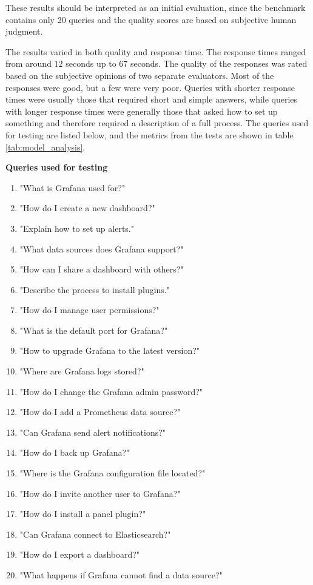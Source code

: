 \documentclass[fleqn,moreauthors,10pt]{ds_report}
\begin{document}
These results should be interpreted as an initial evaluation, since the benchmark contains only 20 queries and the quality scores are based on subjective human judgment.

The results varied in both quality and response time. The response times ranged from around $12$ seconds up to $67$ seconds. The quality of the responses was rated based on the subjective opinions of two separate evaluators. Most of the responses were good, but a few were very poor. Queries with shorter response times were usually those that required short and simple answers, while queries with longer response times were generally those that asked how to set up something and therefore required a description of a full process. The queries used for testing are listed below, and the metrics from the tests are shown in table \ref{tab:model_analysis}.

\textbf{Queries used for testing}
\begin{enumerate}
    \item "What is Grafana used for?"
    \item "How do I create a new dashboard?"
    \item "Explain how to set up alerts."
    \item "What data sources does Grafana support?"
    \item "How can I share a dashboard with others?"
    \item "Describe the process to install plugins."
    \item "How do I manage user permissions?"
    \item "What is the default port for Grafana?"
    \item "How to upgrade Grafana to the latest version?"
    \item "Where are Grafana logs stored?"
    \item "How do I change the Grafana admin password?"
    \item "How do I add a Prometheus data source?"
    \item "Can Grafana send alert notifications?"
    \item "How do I back up Grafana?"
    \item "Where is the Grafana configuration file located?"
    \item "How do I invite another user to Grafana?"
    \item "How do I install a panel plugin?"
    \item "Can Grafana connect to Elasticsearch?"
    \item "How do I export a dashboard?"
    \item "What happens if Grafana cannot find a data source?"
\end{enumerate}
\end{document}
